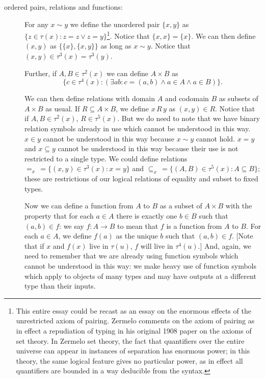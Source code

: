 \documentclass[12pt]{article}
\begin{document}
\begin{description}

\item[ordered pairs, relations and functions:]  For any $x \sim y$ we define the unordered pair $\{x,y\}$ as $\{z \in \tau(x):z=z \vee z=y\}$\footnote{This entire essay could be recast as an essay on the enormous effects of the unrestricted axiom of pairing.  Zermelo comments on the axiom of pairing as in effect a repudiation of typing in his original 1908 paper on the axioms of set theory.  In Zermelo set theory, the fact that quantifiers over the entire universe can appear in instances of separation has enormous power;  in this theory, the same logical feature gives no particular power, as in effect all quantifiers are bounded in a way deducible from the syntax.}.  Notice that $\{x,x\} = \{x\}$.  We can then define $(x,y)$ as
$\{\{x\},\{x,y\}\}$ as long as $x \sim y$.  Notice that $(x,y) \in \tau^3(x)=\tau^3(y)$.

Further, if $A, B \in \tau^2(x)$ we can define $A \times B$ as $$\{c \in \tau^4(x):(\exists ab:c=(a,b) \wedge a \in A \wedge a \in B)\}.$$

We can then define relations with domain $A$ and codomain $B$ as subsets of $A \times B$ as usual.  If $R \subseteq A \times B$, we define $x \, R \, y$ as $(x,y)\in R$.  Notice that if $A,B \in \tau^2(x)$, $R \in \tau^5(x)$.  But we do need to note
that we have binary relation symbols already in use which cannot be understood in this way.  $x \in y$ cannot be understood in this way because $x \sim y$ cannot hold.  $x=y$ and $x \subseteq y$ cannot be understood in this way because their use is not restricted to a single type.  We could define relations $=_x \, = \{(x,y) \in \tau^3(x):x=y\}$ and $\subseteq_x \, = \{(A,B) \in \tau^5(x):A \subseteq B\}$;  these are restrictions of our logical relations of equality and subset to fixed types.

Now we can define a function from $A$ to $B$ as a subset of $A \times B$ with the property that for each $a \in A$ there is exactly one $b \in B$ such that $(a,b) \in f$:  we say $f:A \rightarrow B$ to mean that $f$ is a function from $A$ to $B$.  For each $a \in A$, we define $f(a)$ as the unique $b$ such that $(a,b)\in f$.  [Note that if $x$ and $f(x)$ live in $\tau(u)$,  $f$ will live in $\tau^4(u)$.]  And, again, we need to remember that we are already using function symbols which cannot be understood in this way:  we make heavy use of function symbols which apply to objects of many types and may have outputs at a different type than their inputs.


\end{description}
\end{document}
